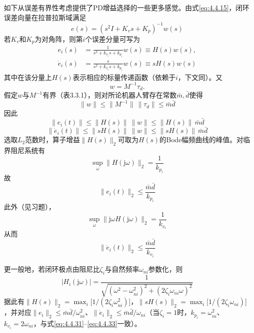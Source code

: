 \documentclass[UTF8]{ctexart}
\theoremstyle{definition}
\begin{document}
如下从误差有界性考虑提供了PD增益选择的一些更多感觉。由式\eqref{eq:4.4.15}，闭环误差向量在拉普拉斯域满足
\begin{equation}\label{eq:4.4.25}
    e(s) = (s^2 I + K_v s + K_p)^{-1} w(s)
\end{equation}
若$K_v$和$K_p$为对角阵，则第$i$个误差分量可写为
\begin{equation}\label{eq:4.4.26}
\begin{aligned}
    e_i(s) &= \frac{1}{s^2 + k_{v_i} s + k_{p_i}} w(s) \equiv H(s) w(s), \\
    \dot{e}_i(s) &= \frac{s}{s^2 + k_{v_i} s + k_{p_i}} w(s) \equiv s H(s) w(s)
\end{aligned}
\end{equation}
其中在该分量上$H(s)$表示相应的标量传递函数（依赖于$i$，下文同）。又
\begin{equation*}
    w = M^{-1} \tau_d .
\end{equation*}
假定$w$与$M^{-1}$有界（表3.3.1），则对所论机器人臂存在常数$\bar{m},\bar{d}$使得
\begin{equation}\label{eq:4.4.27}
    \|w\| \leq \|M^{-1}\| \, \|\tau_d\| \leq \bar{m} \bar{d}
\end{equation}
因此
\begin{equation}\label{eq:4.4.28}
    \|e_i(t)\| \leq \|H(s)\| \, \|w\| \leq \|H(s)\| \, \bar{m} \bar{d}
\end{equation}
\begin{equation}\label{eq:4.4.29}
    \|\dot{e}_i(t)\| \leq \|s H(s)\| \, \|w\| \leq \|s H(s)\| \, \bar{m} \bar{d}
\end{equation}
选取$L_2$范数时，算子增益$\|H(s)\|_2$可取为$H(s)$的Bode幅频曲线的峰值。对临界阻尼系统有
\begin{equation}\label{eq:4.4.30}
    \sup_{\omega} \|H(\mathrm{j}\omega)\|_2 = \frac{1}{k_{p_i}}
\end{equation}
故
\begin{equation}\label{eq:4.4.31}
    \|e_i(t)\|_2 \leq \frac{\bar{m} \bar{d}}{k_{p_i}}
\end{equation}
此外（见习题），
\begin{equation}\label{eq:4.4.32}
    \sup_{\omega} \|\mathrm{j}\omega H(\mathrm{j}\omega)\|_2 = \frac{1}{k_{v_i}}
\end{equation}
从而
\begin{equation}\label{eq:4.4.33}
    \|\dot{e}_i(t)\|_2 \leq \frac{\bar{m} \bar{d}}{k_{v_i}}
\end{equation}

更一般地，若闭环极点由阻尼比$\zeta_i$与自然频率$\omega_{ni}$参数化，则
\begin{equation*}
    |H_i(\mathrm{j}\omega)| = \frac{1}{\sqrt{(\omega^2 - \omega_{ni}^2)^2 + (2\zeta_i\omega_{ni}\omega)^2}}
\end{equation*}
据此有$\|H(s)\|_2 = \max_i \bigl[1/(2\zeta_i\omega_{ni}^2)\bigr]$，$\|sH(s)\|_2 = \max_i \bigl[1/(2\zeta_i\omega_{ni})\bigr]$，并对应$\|e_i\|_2 \leq \bar{m}\bar{d}/\omega_{ni}^2$、$\|\dot{e}_i\|_2 \leq \bar{m}\bar{d}/\omega_{ni}$（当$\zeta_i=1$时，$k_{p_i}=\omega_{ni}^2$、$k_{v_i}=2\omega_{ni}$，与式\eqref{eq:4.4.31}–\eqref{eq:4.4.33}一致）。
\end{document}
